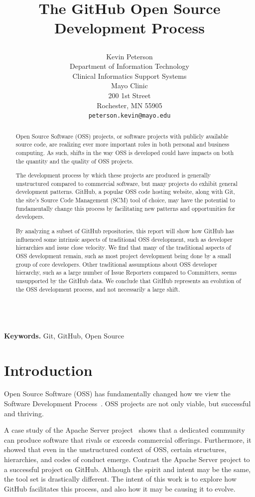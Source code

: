 \documentclass{proc}
\title{
The GitHub Open Source Development Process
\author{Kevin Peterson\\
Department of Information Technology\\
Clinical Informatics Support Systems\\
Mayo Clinic\\
200 1st Street\\
Rochester, MN  55905\\
\small \texttt{peterson.kevin@mayo.edu}
}
}
\begin{document}
\maketitle

\begin{abstract}
Open Source Software (OSS) projects, or software projects with publicly available source code, are realizing ever more important roles in both personal and business computing. As such, shifts in the way OSS is developed could have impacts on both the quantity and the quality of OSS projects.

The development process by which these projects are produced is generally unstructured compared to commercial software, but many projects do exhibit general development patterns. GitHub, a popular OSS code hosting website, along with Git, the site's Source Code Management (SCM) tool of choice, may have the potential to fundamentally change this process by facilitating new patterns and opportunities for developers.

By analyzing a subset of GitHub repositories, this report will show how GitHub has influenced some intrinsic aspects of traditional OSS development, such as developer hierarchies and issue close velocity. We find that many of the traditional aspects of OSS development remain, such as most project development being done by a small group of core developers. Other traditional assumptions about OSS developer hierarchy, such as a large number of Issue Reporters compared to Committers, seems unsupported by the GitHub data. We conclude that GitHub represents an evolution of the OSS development process, and not necessarily a large shift.
\end{abstract}

\noindent \\\textbf{Keywords.} Git, GitHub, Open Source

\section{Introduction}
Open Source Software (OSS) has fundamentally changed how we view the Software Development Process~\cite{raymond1999cathedral}. OSS projects are not only viable, but successful and thriving. 

A case study of the Apache Server project~\cite{mockus2000case} shows that a dedicated community can produce software that rivals or exceeds commercial offerings. Furthermore, it showed that even in the unstructured context of OSS, certain structures, hierarchies, and codes of conduct emerge. Contrast the Apache Server project to a successful project on GitHub. Although the spirit and intent may be the same, the tool set is drastically different. The intent of this work is to explore how GitHub facilitates this process, and also how it may be causing it to evolve.
\end{document}

